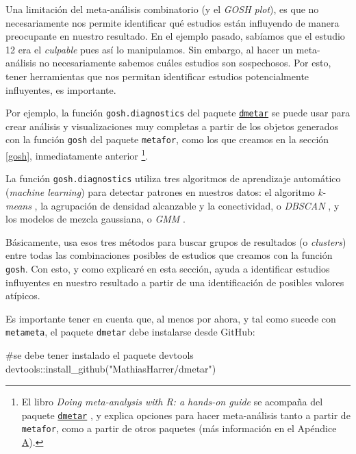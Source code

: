 \documentclass[
  bookmarksnumbered]{article}
\newenvironment{Shaded}{\begin{snugshade}}{\end{snugshade}}
\newcommand{\CommentTok}[1]{\textcolor[rgb]{0.54,0.53,0.53}{#1}}
\newcommand{\FunctionTok}[1]{\textcolor[rgb]{0.39,0.29,0.61}{#1}}
\newcommand{\NormalTok}[1]{\textcolor[rgb]{0.12,0.11,0.11}{#1}}
\newcommand{\SpecialCharTok}[1]{\textcolor[rgb]{0.24,0.68,0.91}{#1}}
\newcommand{\StringTok}[1]{\textcolor[rgb]{0.75,0.01,0.01}{#1}}
\begin{document}
Una limitación del meta-análisis combinatorio (y el \emph{GOSH plot}), es que no necesariamente nos permite identificar qué estudios están influyendo de manera preocupante en nuestro resultado. En el ejemplo pasado, sabíamos que el estudio 12 era el \emph{culpable} pues así lo manipulamos. Sin embargo, al hacer un meta-análisis no necesariamente sabemos cuáles estudios son sospechosos. Por esto, tener herramientas que nos permitan identificar estudios potencialmente influyentes, es importante.

Por ejemplo, la función \texttt{gosh.diagnostics} del paquete \href{https://dmetar.protectlab.org/index.html}{\texttt{dmetar}} \autocite{Harrer2019dmetar} se puede usar para crear análisis y visualizaciones muy completas a partir de los objetos generados con la función \texttt{gosh} del paquete \texttt{metafor}, como los que creamos en la sección \ref{gosh}, inmediatamente anterior \footnote{El libro \emph{Doing meta-analysis with R: a hands-on guide} \autocite{harrer2021doing} se acompaña del paquete \href{https://dmetar.protectlab.org/index.html}{\texttt{dmetar}} \autocite{Harrer2019dmetar}, y explica opciones para hacer meta-análisis tanto a partir de \texttt{metafor}, como a partir de otros paquetes (más información en el Apéndice \hyperlink{apendice-alt}{A}).}.

La función \texttt{gosh.diagnostics} utiliza tres algoritmos de aprendizaje automático (\emph{machine learning}) para detectar patrones en nuestros datos: el algoritmo \emph{k-means} \autocite{hartiganAlgorithm136KMeans1979}, la agrupación de densidad alcanzable y la conectividad, o \emph{DBSCAN} \autocite{schubertDBSCANRevisitedRevisited2017}, y los modelos de mezcla gaussiana, o \emph{GMM} \autocite{fraleyModelBasedClusteringDiscriminant2002}.

Básicamente, usa esos tres métodos para buscar grupos de resultados (o \emph{clusters}) entre todas las combinaciones posibles de estudios que creamos con la función \texttt{gosh}. Con esto, y como explicaré en esta sección, ayuda a identificar estudios influyentes en nuestro resultado a partir de una identificación de posibles valores atípicos.

Es importante tener en cuenta que, al menos por ahora, y tal como sucede con \texttt{metameta}, el paquete \texttt{dmetar} debe instalarse desde GitHub:

\begin{Shaded}
\begin{Highlighting}[]
\CommentTok{\#se debe tener instalado el paquete devtools}
\NormalTok{devtools}\SpecialCharTok{::}\FunctionTok{install\_github}\NormalTok{(}\StringTok{"MathiasHarrer/dmetar"}\NormalTok{)}
\end{Highlighting}
\end{Shaded}
\end{document}
